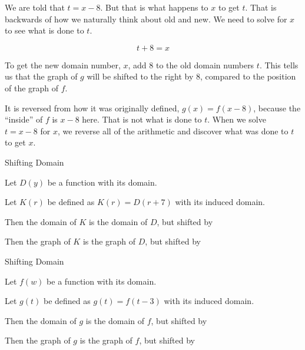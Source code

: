 \documentclass{ximera}
\begin{document}
We are told that $t=x-8$.  But that is what happens to $x$ to get $t$.  That is backwards of how we naturally think about old and new.  We need to solve for $x$ to see what is done to $t$.

\[ t+8=x \]

To get the new domain number, $x$, add $8$ to the old domain numbers $t$.  This tells us that the graph of $g$ will be shifted to the right by $8$, compared to the position of the graph of $f$.


It is reversed from how it was originally defined, $g(x) = f(x-8)$, because the ``inside'' of $f$ is $x-8$ here.  That is not what is done to $t$.  When we solve $t=x-8$ for $x$, we reverse all of the arithmetic and discover what was done to $t$ to get $x$.




\begin{example} Shifting Domain


Let $D(y)$ be a function with its domain.

Let $K(r)$ be defined as $K(r) = D(r+7)$ with its induced domain.


Then the domain of $K$ is the domain of $D$, but shifted  by 


Then the graph of $K$ is the graph of $D$, but shifted  by 




\end{example}












\begin{example} Shifting Domain


Let $f(w)$ be a function with its domain.

Let $g(t)$ be defined as $g(t) = f(t-3)$ with its induced domain.


Then the domain of $g$ is the domain of $f$, but shifted  by 


Then the graph of $g$ is the graph of $f$, but shifted  by 




\end{example}
\end{document}
